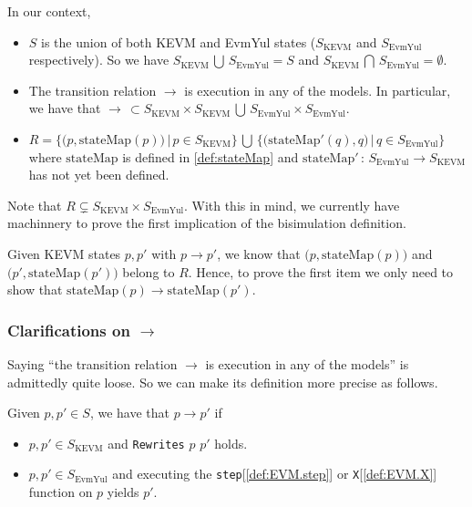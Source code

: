 In our context,
\begin{itemize}
\item $S$ is the union of both KEVM and EvmYul states ($S_{\text{KEVM}}$ and
  $S_{\text{EvmYul}}$ respectively). So we have $S_{\text{KEVM}}\, \bigcup\, S_{\text{EvmYul}} = S$ and $S_{\text{KEVM}}\, \bigcap\, S_{\text{EvmYul}} = \emptyset$.
\item The transition relation $\rightarrow$ is execution in any of the models. In particular, we have that $\rightarrow\,
\subset S_{\text{KEVM}} \times S_{\text{KEVM}} \,\bigcup\, S_{\text{EvmYul}} \times S_{\text{EvmYul}}$.
\item $R = \bigl\{\bigl( p, \text{stateMap}(p) \bigr)\, |\, p\in S_{\text{KEVM}}\bigr\} \,\bigcup\, \bigl\{\bigl(\text{stateMap}'(q),
  q\bigr)\, |\, q\in S_{\text{EvmYul}}\bigr\}$ where $\text{stateMap}$ is
  defined in \ref{def:stateMap} and $\text{stateMap}'\,:\,
  S_{\text{EvmYul}}\rightarrow S_{\text{KEVM}}$ has not yet been defined.

\end{itemize}
Note that $R \subsetneq S_{\text{KEVM}}\times S_{\text{EvmYul}}$.
With this in mind, we currently have machinnery to prove the first implication
of the bisimulation definition.

Given KEVM states $p, p'$ with $p \rightarrow p'$, we know that
$\bigl( p, \text{stateMap}(p) \bigr)$ and $\bigl( p', \text{stateMap}(p')
\bigr)$ belong to $R$. Hence, to prove the first item we only need to show that
$\text{stateMap}(p) \rightarrow \text{stateMap}(p')$.

\subsubsection{Clarifications on $\rightarrow$}

Saying ``the transition relation $\rightarrow$ is execution in any of the
models'' is admittedly quite loose. So we can make its definition more precise
as follows.

\begin{definition}
Given $p, p' \in S$, we have that $p\rightarrow p'$ if
\begin{itemize}
\item $p, p'\in S_{\text{KEVM}}$ and \texttt{Rewrites} $p$ $p'$ holds.
\item $p, p'\in S_{\text{EvmYul}}$ and executing the
  \texttt{step}[\ref{def:EVM.step}] or \texttt{X}[\ref{def:EVM.X}] function on $p$ yields $p'$.
\end{itemize}
\end{definition}

